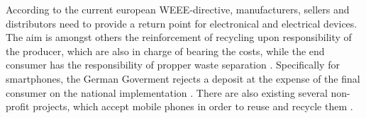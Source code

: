 According to the current european WEEE-directive, manufacturers, sellers and distributors need to provide a return point for electronical and electrical devices. The aim is amongst others the reinforcement of recycling upon responsibility of the producer, which are also in charge of bearing the costs, while the end consumer has the responsibility of propper waste separation \cite{EURLEX}. Specifically for smartphones, the German Goverment rejects a deposit at the expense of the final consumer on the national implementation \cite{BMUB}. There are also existing several non-profit projects, which accept mobile phones in order to reuse and recycle them \cite{NABU}\cite{DUH}.